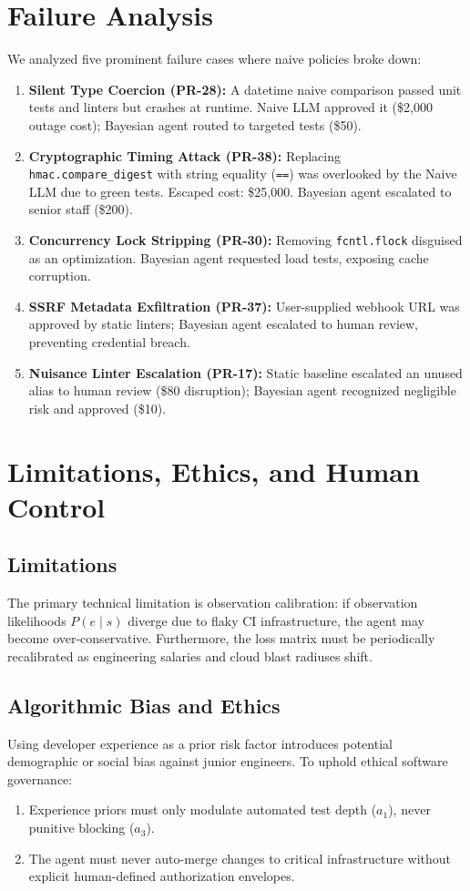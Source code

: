 \documentclass[10pt,twocolumn,letterpaper]{article}
\begin{document}
\section{Failure Analysis}
We analyzed five prominent failure cases where naive policies broke down:
\begin{enumerate}
    \item \textbf{Silent Type Coercion (PR-28):} A datetime naive comparison passed unit tests and linters but crashes at runtime. Naive LLM approved it (\$2,000 outage cost); Bayesian agent routed to targeted tests (\$50).
    \item \textbf{Cryptographic Timing Attack (PR-38):} Replacing \texttt{hmac.compare\_digest} with string equality (\texttt{==}) was overlooked by the Naive LLM due to green tests. Escaped cost: \$25,000. Bayesian agent escalated to senior staff (\$200).
    \item \textbf{Concurrency Lock Stripping (PR-30):} Removing \texttt{fcntl.flock} disguised as an optimization. Bayesian agent requested load tests, exposing cache corruption.
    \item \textbf{SSRF Metadata Exfiltration (PR-37):} User-supplied webhook URL was approved by static linters; Bayesian agent escalated to human review, preventing credential breach.
    \item \textbf{Nuisance Linter Escalation (PR-17):} Static baseline escalated an unused alias to human review (\$80 disruption); Bayesian agent recognized negligible risk and approved (\$10).
\end{enumerate}

\section{Limitations, Ethics, and Human Control}
\subsection{Limitations}
The primary technical limitation is observation calibration: if observation likelihoods $P(e \mid s)$ diverge due to flaky CI infrastructure, the agent may become over-conservative. Furthermore, the loss matrix must be periodically recalibrated as engineering salaries and cloud blast radiuses shift.

\subsection{Algorithmic Bias and Ethics}
Using developer experience as a prior risk factor introduces potential demographic or social bias against junior engineers. To uphold ethical software governance:
\begin{enumerate}
    \item Experience priors must only modulate automated test depth ($a_1$), never punitive blocking ($a_3$).
    \item The agent must never auto-merge changes to critical infrastructure without explicit human-defined authorization envelopes.
\end{enumerate}
\end{document}
